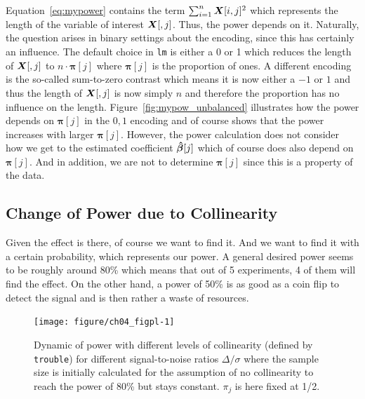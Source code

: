 \documentclass[11pt,a4paper,twoside]{book}\usepackage[]{graphicx}\usepackage[]{xcolor}
\newenvironment{knitrout}{}{} %
\begin{document}
Equation~\eqref{eq:mypower} contains the term $\sum_{i=1}^{n}{\boldsymbol{X}}[i,j]^2$ which represents the length of the variable of interest ${\boldsymbol{X}}[,j]$. Thus, the power depends on it. Naturally, the question arises in binary settings about the encoding, since this has certainly an influence. The default choice in \texttt{lm} is either a 0 or 1 which reduces the length of ${\boldsymbol{X}}[,j]$ to $n\cdot\boldsymbol{\pi}[j]$ where $\boldsymbol{\pi}[j]$ is the proportion of ones. A different encoding is the so-called sum-to-zero contrast which means it is now either a $-1$ or $1$ and thus the length of ${\boldsymbol{X}}[,j]$ is now simply $n$ and therefore the proportion has no influence on the length. Figure~\ref{fig:mypow_unbalanced} illustrates how the power depends on $\boldsymbol{\pi}[j]$ in the $0,1$ encoding and of course shows that the power increases with larger $\boldsymbol{\pi}[j]$. However, the power calculation does not consider how we get to the estimated coefficient ${\boldsymbol{\hat\beta}}[j]$ which of course does also depend on $\boldsymbol{\pi}[j]$. And in addition, we are not to determine $\boldsymbol{\pi}[j]$ since this is a property of the data.

\subsection*{Change of Power due to Collinearity}
Given the effect is there, of course we want to find it. And we want to find it with a certain probability, which represents our power.
A general desired power seems to be roughly around 80\% which means that out of 5 experiments, 4 of them will find the effect.
On the other hand, a power of 50\% is as good as a coin flip to detect the signal and is then rather a waste of resources.

\begin{figure}[h!]%
\begin{center}
\begin{knitrout}
\color{fgcolor}
\texttt{[image: figure/ch04\_figpl-1]} 
\end{knitrout}
\end{center}
\vspace{-1cm}
\caption{Dynamic of power with different levels of collinearity (defined by \texttt{trouble}) for different signal-to-noise ratios $\Delta/\sigma$ where the sample size is initially calculated for the assumption of no collinearity to reach the power of 80\% but stays constant. $\pi_j$ is here fixed at 1/2.}
\label{fig:pl}
\end{figure}
\end{document}
